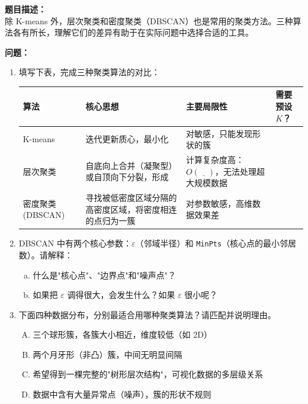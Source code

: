 \documentclass[a4paper,11pt]{ctexart}
\begin{document}
\begin{problembox}
    \textbf{题目描述：}\\
    除 K-means 外，层次聚类和密度聚类（DBSCAN）也是常用的聚类方法。三种算法各有所长，理解它们的差异有助于在实际问题中选择合适的工具。

    \vspace{0.3cm}
    \textbf{问题：}
    \begin{enumerate}[(1)]
        \item 填写下表，完成三种聚类算法的对比：

        \begin{center}
        \begin{tabular}{p{2.2cm} p{3.8cm} p{3.8cm} p{2.6cm}}
            \toprule
            算法 & 核心思想 & 主要局限性 & 需要预设 $K$？ \\
            \midrule
            K-means & 迭代更新质心，最小化\underline{\hspace{1.5cm}} & 对\underline{\hspace{1.5cm}}敏感，只能发现\underline{\hspace{1.5cm}}形状的簇 & \underline{\quad} \\[2em]
            层次聚类 & 自底向上合并（凝聚型）或自顶向下分裂，形成\underline{\hspace{1.5cm}} & 计算复杂度高：$O(\underline{\quad})$，无法处理超大规模数据 & \underline{\quad} \\[2em]
            密度聚类 (DBSCAN) & 寻找被低密度区域分隔的高密度区域，将密度相连的点归为一簇 & 对\underline{\hspace{1.5cm}}参数敏感，高维数据效果差 & \underline{\quad} \\
            \bottomrule
        \end{tabular}
        \end{center}

        \item DBSCAN 中有两个核心参数：$\varepsilon$（邻域半径）和 \texttt{MinPts}（核心点的最小邻居数）。请解释：
        \begin{enumerate}[a.]
            \item 什么是"核心点"、"边界点"和"噪声点"？
            \item 如果把 $\varepsilon$ 调得很大，会发生什么？如果 $\varepsilon$ 很小呢？
        \end{enumerate}

        \item 下面四种数据分布，分别最适合用哪种聚类算法？请匹配并说明理由。
        \begin{enumerate}[A.]
            \item 三个球形簇，各簇大小相近，维度较低（如 2D）
            \item 两个月牙形（非凸）簇，中间无明显间隔
            \item 希望得到一棵完整的"树形层次结构"，可视化数据的多层级关系
            \item 数据中含有大量异常点（噪声），簇的形状不规则
        \end{enumerate}
    \end{enumerate}


\end{problembox}
\end{document}
